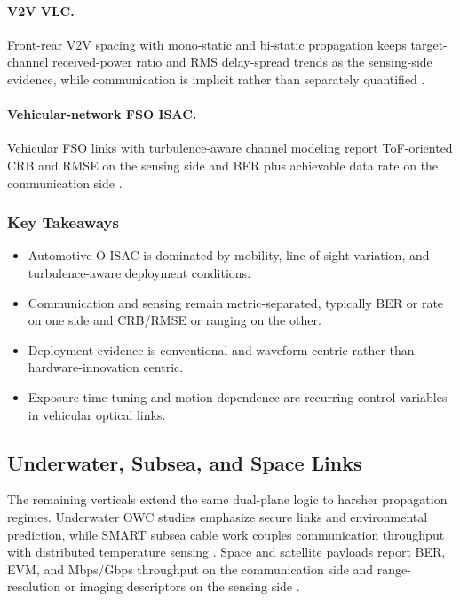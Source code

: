 \paragraph{V2V VLC.}
Front-rear V2V spacing with mono-static and bi-static propagation keeps target-channel received-power ratio and RMS delay-spread trends as the sensing-side evidence, while communication is implicit rather than separately quantified \cite{O_ISAC_003}.

\paragraph{Vehicular-network FSO ISAC.}
Vehicular FSO links with turbulence-aware channel modeling report ToF-oriented CRB and RMSE on the sensing side and BER plus achievable data rate on the communication side \cite{O_ISAC_055}.

\subsubsection{Key Takeaways}
\begin{itemize}
\item Automotive O-ISAC is dominated by mobility, line-of-sight variation, and turbulence-aware deployment conditions.
\item Communication and sensing remain metric-separated, typically BER or rate on one side and CRB/RMSE or ranging on the other.
\item Deployment evidence is conventional and waveform-centric rather than hardware-innovation centric.
\item Exposure-time tuning and motion dependence are recurring control variables in vehicular optical links.
\end{itemize}

\subsection{Underwater, Subsea, and Space Links}
\label{subsec:apps-underwater-space}

The remaining verticals extend the same dual-plane logic to harsher propagation regimes. Underwater OWC studies emphasize secure links and environmental prediction, while SMART subsea cable work couples communication throughput with distributed temperature sensing \cite{O_ISAC_127,O_ISAC_220}. Space and satellite payloads report BER, EVM, and Mbps/Gbps throughput on the communication side and range-resolution or imaging descriptors on the sensing side \cite{O_ISAC_187,O_ISAC_195}.


